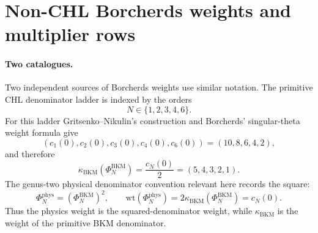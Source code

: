 \providecommand{\Z}{\mathbb{Z}}
\providecommand{\Q}{\mathbb{Q}}
\providecommand{\C}{\mathbb{C}}
\providecommand{\HH}{\mathbb{H}}
\providecommand{\cO}{\mathcal{O}}
\providecommand{\cG}{\mathcal{G}}
\providecommand{\kBKM}{\kappa_{\mathrm{BKM}}}
\providecommand{\kch}{\kappa_{\mathrm{ch}}}
\providecommand{\kcat}{\kappa_{\mathrm{cat}}}
\providecommand{\kfib}{\kappa_{\mathrm{fiber}}}
\providecommand{\Sp}{\mathrm{Sp}}
\providecommand{\Mp}{\mathrm{Mp}}
\providecommand{\Aut}{\mathrm{Aut}}
\providecommand{\Auts}{\mathrm{Aut}_{s}}
\providecommand{\Fix}{\mathrm{Fix}}
\providecommand{\Kum}{\mathrm{Kum}}
\providecommand{\wt}{\mathrm{wt}}
\providecommand{\BV}{\mathrm{BV}}
\providecommand{\MTW}{\mathrm{MTW}}
\providecommand{\Delfnm}[2]{\Delta_{#1}^{(#2)}}

\section*{Non-CHL Borcherds weights and multiplier rows}
\label{sec:non-chl-borcherds-weights-multiplier-rows}

\paragraph{Two catalogues.}
Two independent sources of Borcherds weights use similar notation.  The
primitive CHL denominator ladder is indexed by the
orders
\[
  N\in \{1,2,3,4,6\}.
\]
For this ladder Gritsenko--Nikulin's construction and Borcherds'
singular-theta weight formula give
\[
  (c_1(0),c_2(0),c_3(0),c_4(0),c_6(0))
  =(10,8,6,4,2),
\]
and therefore
\[
  \kBKM(\Phi_N^{\mathrm{BKM}})
  =\frac{c_N(0)}{2}
  =(5,4,3,2,1).
\]
The genus-two physical denominator convention relevant here records the
square:
\[
  \Phi_N^{\mathrm{phys}}=(\Phi_N^{\mathrm{BKM}})^2,\qquad
  \wt(\Phi_N^{\mathrm{phys}})=2\kBKM(\Phi_N^{\mathrm{BKM}})
  =c_N(0).
\]
Thus the physics weight is the squared-denominator weight, while
\(\kBKM\) is the weight of the primitive BKM denominator.

